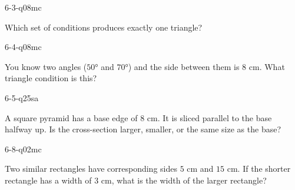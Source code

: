 \begin{practiceQuestion}{6-3-q08}{mc}
\begin{questionText}
Which set of conditions produces exactly one triangle?
\end{questionText}
\end{practiceQuestion}

\begin{practiceQuestion}{6-4-q08}{mc}
\begin{questionText}
You know two angles ($50°$ and $70°$) and the side between them is $8$ cm. What triangle condition is this?
\end{questionText}
\end{practiceQuestion}

\begin{practiceQuestion}{6-5-q25}{sa}
\begin{questionText}
A square pyramid has a base edge of $8$ cm. It is sliced parallel to the base halfway up. Is the cross-section larger, smaller, or the same size as the base?
\end{questionText}
\end{practiceQuestion}

\begin{practiceQuestion}{6-8-q02}{mc}
\begin{questionText}
Two similar rectangles have corresponding sides $5$ cm and $15$ cm. If the shorter rectangle has a width of $3$ cm, what is the width of the larger rectangle?
\end{questionText}
\end{practiceQuestion}

